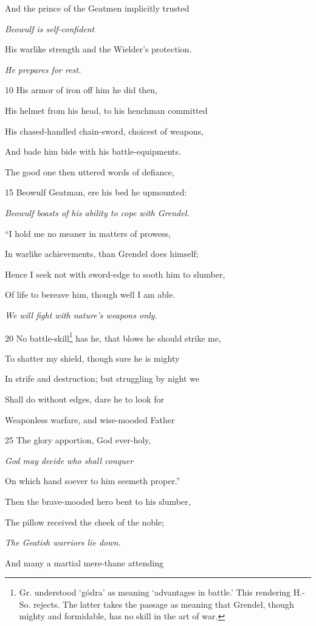 And the prince of the Geatmen implicitly trusted

\emph{Beowulf is self-confident}

His warlike strength and the Wielder’s protection.

\emph{He prepares for
rest.}

10
His armor of iron off him he did then,

His helmet from his head, to his henchman committed

His chased-handled chain-sword, choicest of weapons,

And bade him bide with his battle-equipments.

The good one then uttered words of defiance,

15
Beowulf Geatman, ere his bed he upmounted:

\emph{Beowulf boasts of
his ability to cope
with Grendel.}

“I hold me no meaner in matters of prowess,

In warlike achievements, than Grendel does himself;

Hence I seek not with sword-edge to sooth him to slumber,

Of life to bereave him, though well I am able.

\emph{We will fight with
nature’s weapons
only.}

20
No battle-skill\footnote{Gr. understood ‘gódra’ as meaning ‘advantages in battle.’ This rendering
H.-So. rejects. The latter takes the passage as meaning that Grendel,
though mighty and formidable, has no skill in the art of war.} has he, that blows he should strike me,

To shatter my shield, though sure he is mighty

In strife and destruction; but struggling by night we

Shall do without edges, dare he to look for

Weaponless warfare, and wise-mooded Father

25
The glory apportion, God ever-holy,

\emph{God may decide
who shall conquer}

On which hand soever to him seemeth proper.”

Then the brave-mooded hero bent to his slumber,

The pillow received the cheek of the noble;

\emph{The Geatish warriors
lie down.}

And many a martial mere-thane attending

